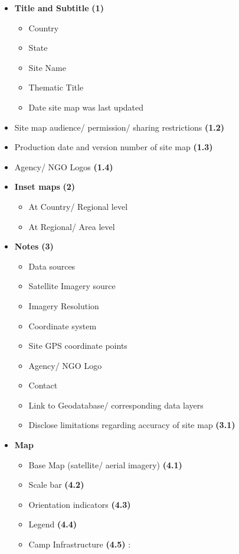 \documentclass[
  a4paper,
  onecolumn,
  oneside]{book}
\providecommand{\tightlist}{%
  \setlength{\itemsep}{0pt}\setlength{\parskip}{0pt}}\usepackage{longtable,booktabs,array}
\begin{document}
\begin{itemize}
\item
  \textbf{Title and Subtitle} \textbf{(1)}

  \begin{itemize}
  \tightlist
  \item
    Country
  \item
    State
  \item
    Site Name
  \item
    Thematic Title
  \item
    Date site map was last updated
  \end{itemize}
\item
  Site map audience/ permission/ sharing restrictions \textbf{(1.2)}
\item
  Production date and version number of site map \textbf{(1.3)}
\item
  Agency/ NGO Logos \textbf{(1.4)}
\item
  \textbf{Inset maps} \textbf{(2)}

  \begin{itemize}
  \tightlist
  \item
    At Country/ Regional level
  \item
    At Regional/ Area level
  \end{itemize}
\item
  \textbf{Notes} \textbf{(3)}

  \begin{itemize}
  \tightlist
  \item
    Data sources
  \item
    Satellite Imagery source
  \item
    Imagery Resolution
  \item
    Coordinate system
  \item
    Site GPS coordinate points
  \item
    Agency/ NGO Logo
  \item
    Contact
  \item
    Link to Geodatabase/ corresponding data layers
  \item
    Disclose limitations regarding accuracy of site map \textbf{(3.1)}
  \end{itemize}
\item
  \textbf{Map}

  \begin{itemize}
  \tightlist
  \item
    Base Map (satellite/ aerial imagery) \textbf{(4.1)}
  \item
    Scale bar \textbf{(4.2)}
  \item
    Orientation indicators \textbf{(4.3)}
  \item
    Legend \textbf{(4.4)}
  \item
    Camp Infrastructure \textbf{(4.5)} :


\end{itemize}
\end{itemize}
\end{document}
